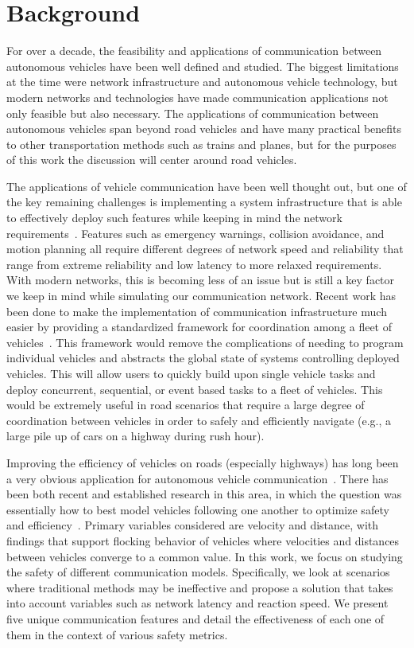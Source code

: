 \section{Background}

For over a decade, the feasibility and applications of communication between autonomous
vehicles have been well defined and studied. The biggest limitations at the time were
network infrastructure and autonomous vehicle technology, but modern networks and technologies
have made communication applications not only feasible but also necessary. 
The applications of communication between autonomous vehicles
span beyond road vehicles and have many practical benefits to other transportation methods
such as trains and planes, but for the purposes of this work the discussion will center
around road vehicles.

The applications of vehicle communication have been well thought out, but one of the key remaining
challenges is implementing a system infrastructure that is able to
effectively deploy such features while keeping in mind the network requirements~\cite{willke2009survey}.
Features such as emergency warnings, collision avoidance, and motion planning
all require different degrees of network speed and reliability that range from
extreme reliability and low latency to more relaxed requirements. With modern networks,
this is becoming less of an issue but is still a key factor we keep in mind while
simulating our communication network.
Recent work has been done to make
the implementation of communication infrastructure much easier by providing a standardized
framework for coordination among a fleet of vehicles~\cite{keila2018}.
This framework would remove
the complications of needing to program individual vehicles and abstracts the global
state of systems controlling deployed vehicles. This will allow users to quickly build
upon single vehicle tasks and deploy concurrent, sequential, or event based tasks
to a fleet of vehicles. This would be extremely useful in road scenarios that require
a large degree of coordination between vehicles in order to safely and efficiently
navigate (e.g., a large pile up of cars on a highway during rush hour).

Improving the efficiency of vehicles on roads (especially highways) has long been a
very obvious application for autonomous vehicle communication~\cite{murray2007recent}.
There has been both recent and established research in this area, in which the question
was essentially how to best model vehicles following one another to
optimize safety and efficiency~\cite{ou2017extended, tanner2003coordination}.
Primary variables considered are velocity
and distance, with findings that support flocking behavior of vehicles where velocities
and distances between vehicles converge to a common value.
In this work, we focus on studying the safety of different communication models.
Specifically, we look at scenarios where traditional methods may be ineffective and propose
a solution that takes into account variables such as network latency and reaction speed.
We present five unique communication features and detail the effectiveness of each one of them
in the context of various safety metrics.